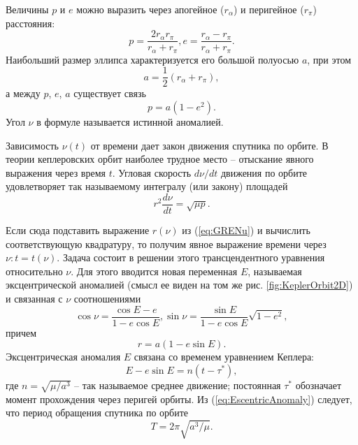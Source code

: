 Величины $p$ и $e$ можно выразить через апогейное
($r_{\alpha}$) и перигейное ($r_{\pi}$) расстояния:
\begin{equation}
  p = \frac{2r_{\alpha}r_{\pi}}{r_{\alpha} + r_{\pi}},
  e = \frac{r_{\alpha} - r_{\pi}}{r_{\alpha} + r_{\pi}}.
\end{equation}
Наибольший размер эллипса характеризуется его большой полуосью $a$, при этом
\begin{equation}
  a = \frac{1}{2}(r_{\alpha} + r_{\pi}),
\end{equation}
а между $p$, $e$, $a$ существует связь
\begin{equation}
  p = a(1 - e^2).
\end{equation}
Угол $\nu$ в формуле \label{eq:GRENu} называется истинной аномалией.\par
Зависимость $\nu(t)$ от времени дает закон движения спутника по орбите. В теории
кеплеровских орбит наиболее трудное место -- отыскание явного выражения через время
$t$. Угловая скорость $d\nu/dt$ движения по орбите удовлетворяет так называемому
интегралу (или закону) площадей
\begin{equation} \label{eq:GIntegralSquares}
  r^2\frac{d\nu}{dt} = \sqrt{\mu p}.
\end{equation}\par
Если сюда подставить выражение $r(\nu)$ из (\ref{eq:GRENu}) и вычислить соответствующую
квадратуру, то получим явное выражение времени через $\nu: t = t(\nu)$. Задача состоит
в решении этого трансцендентного уравнения относительно $\nu$. Для этого вводится
новая переменная $E$, называемая эксцентрической аномалией (смысл ее виден на том
же рис. \ref{fig:KeplerOrbit2D}) и связанная с $\nu$ соотношениями
\begin{equation}
  \cos\nu = \frac{\cos E - e}{1 - e\cos E}, \sin\nu = \frac{\sin E}{1 - e\cos E}\sqrt{1 - e^2},
\end{equation}
причем
\begin{equation}
  r = a(1 - e\sin E).
\end{equation}
Эксцентрическая аномалия $E$ связана со временем уравнением Кеплера:
\begin{equation} \label{eq:EscentricAnomaly}
  E - e\sin E = n(t-\tau^*),
\end{equation}
где $n = \sqrt{\mu/a^3}$ -- так называемое среднее движение; постоянная $\tau^*$
обозначает момент прохождения через перигей орбиты. Из (\ref{eq:EscentricAnomaly})
следует, что период обращения спутника по орбите
\begin{equation}
  T = 2\pi\sqrt{a^3/\mu}.
\end{equation}\par
